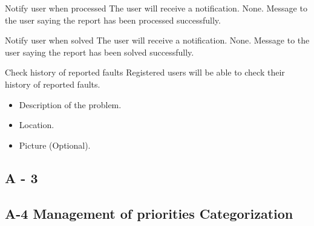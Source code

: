 \begin{requirement}{Notify user when processed}
\reqdesc The user will receive a notification.
\reqin None.
\reqout Message to the user saying the report has been processed successfully.
\end{requirement}

\begin{requirement}{Notify user when solved}
\reqdesc The user will receive a notification.
\reqin None.
\reqout Message to the user saying the report has been solved successfully.
\end{requirement}

\begin{requirement}{Check history of reported faults}
\reqdesc Registered users will be able to check their history of reported faults.
\reqin 
\begin{itemize}
	\item Description of the problem.
	\item Location.
	\item Picture (Optional).
\end{itemize}
\reqout
\reqsteps
\end{requirement}


\subsection{A - 3}


\subsection{A-4 Management of priorities Categorization}

